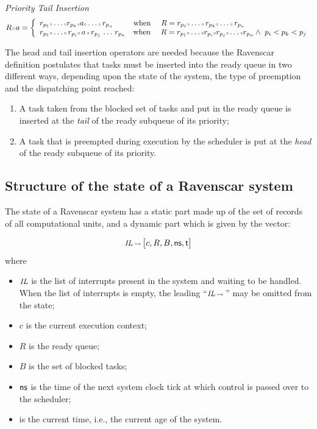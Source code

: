 \hspace{-7mm} \emph{Priority Tail Insertion} \\
\begin{equation}
\label{pri_tl_ins}
  R \smodot a  = \left \{
    \begin{array}{l}
      r_{p_1}\smcirc\ldots\smcirc r_{p_k}\smcirc a\smcirc\ldots\smcirc\,r_{p_n} 
      \ \ \ \ \ \ \ \ \text{when}\ \ \ \ 
      R=r_{p_1}\smcirc\ldots\smcirc\,r_{p_k}\smcirc\ldots\smcirc\,r_{p_n}  \\ 
      r_{p_1}\smcirc\ldots\smcirc\,r_{p_i}\smcirc\,a\,\smcirc\,r_{p_j}\,\ldots\,r_{p_n}
      \ \ \ \text{when} \ \ \ \   
      R = r_{p_1}\smcirc\ldots\smcirc r_{p_i}\smcirc r_{p_j}\smcirc\ldots\smcirc r_{p_n} 
       \wedge \  p_i < p_k < p_j  
    \end{array} 
  \right.
\end{equation}

The head and tail insertion operators are needed because the Ravenscar
definition postulates that tasks must be inserted into the ready queue
in two different ways, depending upon the state of the system, the
type of preemption and the dispatching point reached:

\begin{enumerate}
\item{A task taken from the blocked set of tasks and put in the ready
  queue is inserted at the \emph{tail} of the ready subqueue of its
  priority;}
\item{A task that is preempted during execution by the scheduler is
  put at the \emph{head} of the ready subqueue of its priority.}
\end{enumerate}

\subsection{Structure of the state of a Ravenscar system}
The state of a Ravenscar system has a static part made up of the set
of records of all computational units, and a dynamic part which is
given by the vector:

\begin{equation}
  \text{\small \textit{IL}} \,{\scriptstyle\leadsto}\,
  \big[ c, R, B, \text{\sffamily ns}, \text{\sffamily t} \big]
\end{equation}
\noindent
where 
\begin{itemize}
  \item{$\text{\small \textit{IL}}$ is the list of interrupts present
    in the system and waiting to be handled. When the list of
    interrupts is empty, the leading ``$\text{\small \textit{IL}}
    \,{\scriptstyle\leadsto}\,$'' may be omitted from the state;}
  \item{$c$ is the current execution context;}
  \item{$R$ is the ready queue;}
  \item{$B$ is the set of blocked tasks;} 
  \item{$\text{\sffamily ns}$ is the time of the next system clock
    tick at which control is passed over to the scheduler;}
  \item{\SFT{t} is the current time, i.e., the current age of the
    system.}
\end{itemize}

